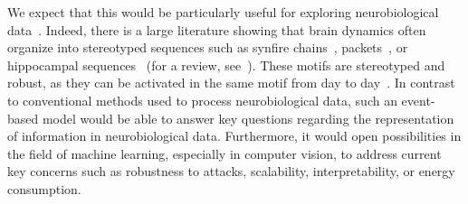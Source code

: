 \documentclass[runningheads]{llncs}
\begin{document}
We expect that this would be particularly useful for exploring neurobiological data~\cite{mackevicius_unsupervised_2019}. Indeed, there is a large literature showing that brain dynamics often organize into stereotyped sequences such as synfire chains~\cite{ikegaya_synfire_2004}, packets~\cite{luczak_sequential_2007}, or hippocampal sequences~\cite{pastalkova_internally_2008,villette_internally_2015} (for a review, see~\cite{grimaldi_precise_2022}). These motifs are stereotyped and robust, as they can be activated in the same motif from day to day~\cite{haimerl_internal_2019}. In contrast to conventional methods used to process neurobiological data, such an event-based model would be able to answer key questions regarding the representation of information in neurobiological data. Furthermore, it would open possibilities in the field of machine learning, especially in computer vision, to address current key concerns such as robustness to attacks, scalability, interpretability, or energy consumption.
\end{document}
